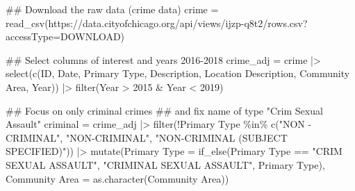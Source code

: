 \documentclass[
]{report}
\newenvironment{Shaded}{}{}
\newcommand{\AttributeTok}[1]{\textcolor[rgb]{0.65,0.15,0.64}{#1}}
\newcommand{\DecValTok}[1]{\textcolor[rgb]{0.60,0.41,0.00}{#1}}
\newcommand{\DocumentationTok}[1]{\textcolor[rgb]{0.89,0.34,0.29}{#1}}
\newcommand{\FunctionTok}[1]{\textcolor[rgb]{0.25,0.47,0.95}{#1}}
\newcommand{\NormalTok}[1]{\textcolor[rgb]{0.22,0.23,0.26}{#1}}
\newcommand{\OtherTok}[1]{\textcolor[rgb]{0.15,0.68,0.38}{#1}}
\newcommand{\SpecialCharTok}[1]{\textcolor[rgb]{0.00,0.52,0.74}{#1}}
\newcommand{\StringTok}[1]{\textcolor[rgb]{0.31,0.63,0.31}{#1}}
\begin{document}
\begin{Shaded}
\begin{Highlighting}[]
\DocumentationTok{\#\# Download the raw data (crime data)}
\NormalTok{crime }\OtherTok{=} \FunctionTok{read\_csv}\NormalTok{(}\StringTok{\textquotesingle{}https://data.cityofchicago.org/api/views/ijzp{-}q8t2/rows.csv?accessType=DOWNLOAD\textquotesingle{}}\NormalTok{)}

\DocumentationTok{\#\# Select columns of interest and years 2016{-}2018}
\NormalTok{crime\_adj }\OtherTok{=}\NormalTok{ crime }\SpecialCharTok{|\textgreater{}} 
  \FunctionTok{select}\NormalTok{(}\FunctionTok{c}\NormalTok{(ID, Date, }\StringTok{\textasciigrave{}}\AttributeTok{Primary Type}\StringTok{\textasciigrave{}}\NormalTok{, Description, }\StringTok{\textasciigrave{}}\AttributeTok{Location Description}\StringTok{\textasciigrave{}}\NormalTok{, }\StringTok{\textasciigrave{}}\AttributeTok{Community Area}\StringTok{\textasciigrave{}}\NormalTok{, Year)) }\SpecialCharTok{|\textgreater{}} 
  \FunctionTok{filter}\NormalTok{(Year }\SpecialCharTok{\textgreater{}} \DecValTok{2015} \SpecialCharTok{\&}\NormalTok{ Year }\SpecialCharTok{\textless{}} \DecValTok{2019}\NormalTok{)}

\DocumentationTok{\#\# Focus on only criminal crimes}
\DocumentationTok{\#\# and fix name of type "Crim Sexual Assault"}
\NormalTok{criminal }\OtherTok{=}\NormalTok{ crime\_adj }\SpecialCharTok{|\textgreater{}} 
  \FunctionTok{filter}\NormalTok{(}\SpecialCharTok{!}\StringTok{\textasciigrave{}}\AttributeTok{Primary Type}\StringTok{\textasciigrave{}} \SpecialCharTok{\%in\%} \FunctionTok{c}\NormalTok{(}\StringTok{"NON {-} CRIMINAL"}\NormalTok{, }\StringTok{"NON{-}CRIMINAL"}\NormalTok{, }\StringTok{"NON{-}CRIMINAL (SUBJECT SPECIFIED)"}\NormalTok{)) }\SpecialCharTok{|\textgreater{}} 
  \FunctionTok{mutate}\NormalTok{(}\StringTok{\textasciigrave{}}\AttributeTok{Primary Type}\StringTok{\textasciigrave{}} \OtherTok{=} \FunctionTok{if\_else}\NormalTok{(}\StringTok{\textasciigrave{}}\AttributeTok{Primary Type}\StringTok{\textasciigrave{}} \SpecialCharTok{==} \StringTok{"CRIM SEXUAL ASSAULT"}\NormalTok{, }\StringTok{"CRIMINAL SEXUAL ASSAULT"}\NormalTok{, }\StringTok{\textasciigrave{}}\AttributeTok{Primary Type}\StringTok{\textasciigrave{}}\NormalTok{),}
         \StringTok{\textasciigrave{}}\AttributeTok{Community Area}\StringTok{\textasciigrave{}} \OtherTok{=} \FunctionTok{as.character}\NormalTok{(}\StringTok{\textasciigrave{}}\AttributeTok{Community Area}\StringTok{\textasciigrave{}}\NormalTok{))}


\end{Highlighting}
\end{Shaded}
\end{document}
